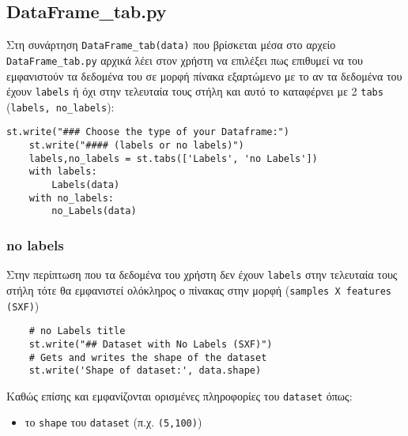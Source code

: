 \documentclass[a4paper,12pt]{article}
\begin{document}
\newpage



\subsection{DataFrame\_tab.py}
Στη συνάρτηση \texttt{DataFrame\_tab(data)} που βρίσκεται μέσα στο αρχείο \texttt{DataFrame\_tab.py} αρχικά λέει στον χρήστη να επιλέξει πως επιθυμεί να του εμφανιστούν τα δεδομένα του σε μορφή πίνακα εξαρτώμενο με το αν τα δεδομένα του έχουν \texttt{labels} ή όχι στην τελευταία τους στήλη και αυτό το καταφέρνει με 2 \texttt{tabs} (\texttt{labels, no\_labels}):
\begin{lstlisting}
st.write("### Choose the type of your Dataframe:")
    st.write("#### (labels or no labels)")
    labels,no_labels = st.tabs(['Labels', 'no Labels'])
    with labels:
        Labels(data)
    with no_labels: 
        no_Labels(data)
\end{lstlisting}



\newpage




\subsubsection{no labels}
Στην περίπτωση που τα δεδομένα του χρήστη δεν έχουν \texttt{labels} στην τελευταία τους στήλη τότε θα εμφανιστεί ολόκληρος ο πίνακας στην μορφή (\texttt{samples X features (SXF)})
\begin{lstlisting}
    # no Labels title
    st.write("## Dataset with No Labels (SXF)")
    # Gets and writes the shape of the dataset
    st.write('Shape of dataset:', data.shape)
\end{lstlisting}
Καθώς επίσης και εμφανίζονται ορισμένες πληροφορίες του \texttt{dataset} όπως:
\begin{itemize}
  \item το \texttt{shape} του \texttt{dataset} (π.χ. \texttt{(5,100)})
\end{itemize}
\end{document}
